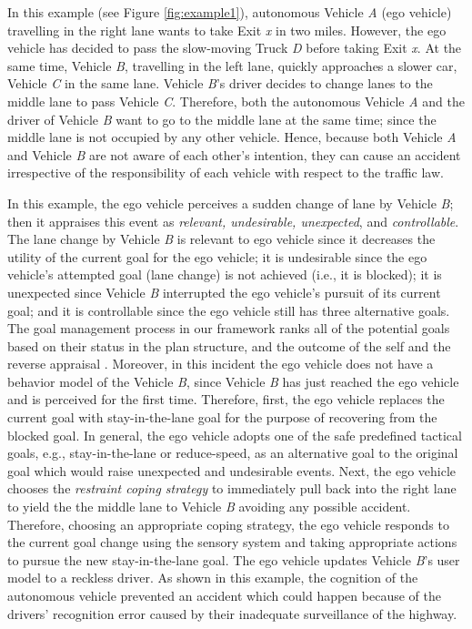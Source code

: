 \documentclass[journal, 11pt]{IEEEtran}
\begin{document}
In this example (see Figure \ref{fig:example1}), autonomous Vehicle \textit{A}
(ego vehicle) travelling in the right lane wants to take Exit \textit{x} in two
miles. However, the ego vehicle has decided to pass the slow-moving Truck
\textit{D} before taking Exit \textit{x}. At the same time, Vehicle \textit{B},
travelling in the left lane, quickly approaches a slower car, Vehicle \textit{C}
in the same lane. Vehicle \textit{B}'s driver decides to change lanes to the
middle lane to pass Vehicle \textit{C}. Therefore, both the autonomous Vehicle
\textit{A} and the driver of Vehicle \textit{B} want to go to the middle lane at
the same time; since the middle lane is not occupied by any other vehicle.
Hence, because both Vehicle \textit{A} and Vehicle \textit{B} are not aware of
each other's intention, they can cause an accident irrespective of the
responsibility of each vehicle with respect to the traffic law.

In this example, the ego vehicle perceives a sudden change of lane by Vehicle
\textit{B}; then it appraises this event as \textit{relevant, undesirable,
unexpected}, and \textit{controllable}. The lane change by Vehicle \textit{B} is
relevant to ego vehicle since it decreases the utility of the current goal for
the ego vehicle; it is undesirable since the ego vehicle's attempted goal (lane
change) is not achieved (i.e., it is blocked); it is unexpected since Vehicle
\textit{B} interrupted the ego vehicle's pursuit of its current goal; and it is
controllable since the ego vehicle still has three alternative goals.
The goal management process in our framework ranks all of the potential goals
based on their status in the plan structure, and the outcome of the self and the
reverse appraisal \cite{shayganfar:goal-management}. Moreover, in this incident
the ego vehicle does not have a behavior model of the Vehicle \textit{B}, since
Vehicle \textit{B} has just reached the ego vehicle and is perceived for the
first time. Therefore, first, the ego vehicle replaces the current goal with
stay-in-the-lane goal for the purpose of recovering from the blocked goal. In
general, the ego vehicle adopts one of the safe predefined tactical goals, e.g.,
stay-in-the-lane or reduce-speed, as an alternative goal to the original goal
which would raise unexpected and undesirable events. Next, the ego vehicle
chooses the \textit{restraint coping strategy} to immediately pull back into the
right lane to yield the the middle lane to Vehicle \textit{B} avoiding any
possible accident. Therefore, choosing an appropriate coping strategy, the ego
vehicle responds to the current goal change using the sensory system and taking
appropriate actions to pursue the new stay-in-the-lane goal. The ego vehicle
updates Vehicle \textit{B}'s user model to a reckless driver. As shown in this
example, the cognition of the autonomous vehicle prevented an accident which
could happen because of the drivers' recognition error caused by their
inadequate surveillance of the highway.
\end{document}
